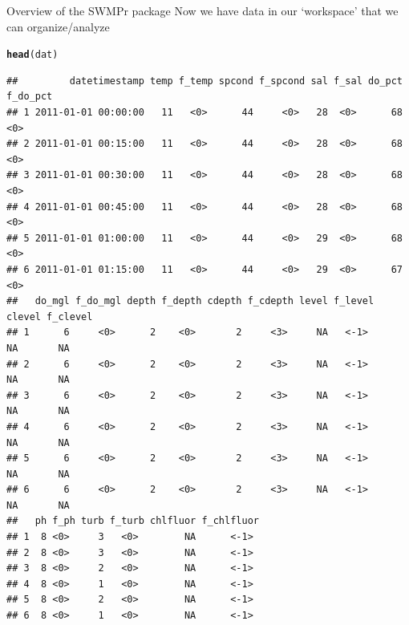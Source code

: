\documentclass[xcolor=svgnames]{beamer}\usepackage[]{graphicx}\usepackage[]{color}
\makeatletter
\newcommand{\hlstd}[1]{\textcolor[rgb]{0.345,0.345,0.345}{#1}}%
\newcommand{\hlkwd}[1]{\textcolor[rgb]{0.737,0.353,0.396}{\textbf{#1}}}%
\newenvironment{kframe}{%
 \def\at@end@of@kframe{}%
 \ifinner\ifhmode%
  \def\at@end@of@kframe{\end{minipage}}%
  \begin{minipage}{\columnwidth}%
 \fi\fi%
 \def\FrameCommand##1{\hskip\@totalleftmargin \hskip-\fboxsep
 \colorbox{shadecolor}{##1}\hskip-\fboxsep
     \hskip-\linewidth \hskip-\@totalleftmargin \hskip\columnwidth}%
 \MakeFramed {\advance\hsize-\width
   \@totalleftmargin\z@ \linewidth\hsize
   \@setminipage}}%
 {\par\unskip\endMakeFramed%
 \at@end@of@kframe}
\newenvironment{knitrout}{}{} %
\newcommand{\Bigtxt}[1]{\textbf{\textit{#1}}}
\makeatother
\begin{document}
\begin{frame}{Overview of the SWMPr package}
Now we have data in our `workspace' that we can organize/analyze

\begin{knitrout}\scriptsize
{}\color{fgcolor}\begin{kframe}
\begin{alltt}
\hlkwd{head}\hlstd{(dat)}
\end{alltt}
\begin{verbatim}
##         datetimestamp temp f_temp spcond f_spcond sal f_sal do_pct f_do_pct
## 1 2011-01-01 00:00:00   11   <0>      44     <0>   28  <0>      68     <0> 
## 2 2011-01-01 00:15:00   11   <0>      44     <0>   28  <0>      68     <0> 
## 3 2011-01-01 00:30:00   11   <0>      44     <0>   28  <0>      68     <0> 
## 4 2011-01-01 00:45:00   11   <0>      44     <0>   28  <0>      68     <0> 
## 5 2011-01-01 01:00:00   11   <0>      44     <0>   29  <0>      68     <0> 
## 6 2011-01-01 01:15:00   11   <0>      44     <0>   29  <0>      67     <0> 
##   do_mgl f_do_mgl depth f_depth cdepth f_cdepth level f_level clevel f_clevel
## 1      6     <0>      2    <0>       2     <3>     NA   <-1>      NA       NA
## 2      6     <0>      2    <0>       2     <3>     NA   <-1>      NA       NA
## 3      6     <0>      2    <0>       2     <3>     NA   <-1>      NA       NA
## 4      6     <0>      2    <0>       2     <3>     NA   <-1>      NA       NA
## 5      6     <0>      2    <0>       2     <3>     NA   <-1>      NA       NA
## 6      6     <0>      2    <0>       2     <3>     NA   <-1>      NA       NA
##   ph f_ph turb f_turb chlfluor f_chlfluor
## 1  8 <0>     3   <0>        NA      <-1> 
## 2  8 <0>     3   <0>        NA      <-1> 
## 3  8 <0>     2   <0>        NA      <-1> 
## 4  8 <0>     1   <0>        NA      <-1> 
## 5  8 <0>     2   <0>        NA      <-1> 
## 6  8 <0>     1   <0>        NA      <-1>
\end{verbatim}
\end{kframe}
\end{knitrout}
\end{frame}

\end{document}
